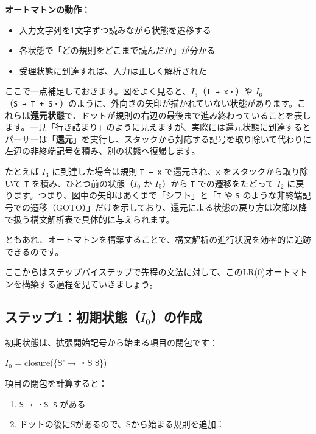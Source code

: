 \textbf{オートマトンの動作：}

\begin{itemize}
\tightlist
\item
  入力文字列を1文字ずつ読みながら状態を遷移する
\item
  各状態で「どの規則をどこまで読んだか」が分かる
\item
  受理状態に到達すれば、入力は正しく解析された
\end{itemize}

ここで一点補足しておきます。図をよく見ると、\(I_3\)（\texttt{T\ →\ x・}）や
\(I_6\)（\texttt{S\ →\ T\ +\ S・}）のように、外向きの矢印が描かれていない状態があります。これらは\textbf{還元状態}で、ドットが規則の右辺の最後まで進み終わっていることを表します。一見「行き詰まり」のように見えますが、実際には還元状態に到達するとパーサーは「\textbf{還元}」を実行し、スタックから対応する記号を取り除いて代わりに左辺の非終端記号を積み、別の状態へ復帰します。

たとえば \(I_3\) に到達した場合は規則 \texttt{T\ →\ x}
で還元され、\texttt{x} をスタックから取り除いて \texttt{T}
を積み、ひとつ前の状態（\(I_0\) か \(I_5\)）から \texttt{T}
での遷移をたどって \(I_2\)
に戻ります。つまり、図中の矢印はあくまで「シフト」と「\texttt{T} や
\texttt{S}
のような非終端記号での遷移（GOTO）」だけを示しており、還元による状態の戻り方は次節以降で扱う構文解析表で具体的に与えられます。

ともあれ、オートマトンを構築することで、構文解析の進行状況を効率的に追跡できるのです。

ここからはステップバイステップで先程の文法に対して、このLR(0)オートマトンを構築する過程を見ていきましょう。

\hypertarget{chapter5-ux30b9ux30c6ux30c3ux30d71ux521dux671fux72b6ux614bi_0ux306eux4f5cux6210}{%
\subsection{\texorpdfstring{ステップ1：初期状態（\(I_0\)）の作成}{ステップ1：初期状態（I\_0）の作成}}\label{chapter5-ux30b9ux30c6ux30c3ux30d71ux521dux671fux72b6ux614bi_0ux306eux4f5cux6210}}

初期状態は、拡張開始記号から始まる項目の閉包です：

\(I_0\) = closure(\{S' → ・S \$\})

項目の閉包を計算すると：

\begin{enumerate}
\def\labelenumi{\arabic{enumi}.}
\tightlist
\item
  \texttt{S\textquotesingle{}\ →\ ・S\ \$} がある
\item
  ドットの後にSがあるので、Sから始まる規則を追加：
\end{enumerate}

